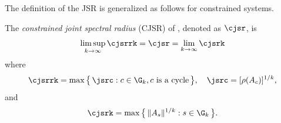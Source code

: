 The definition of the JSR is generalized as follows for constrained systems.
\begin{definition}
  \label{def:cjsr}
  The \emph{constrained joint spectral radius} (CJSR) of
  , denoted as $\cjsr$,
  is
  \begin{equation}
    \label{eq:jsrtheo}
    \limsup_{k \to \infty} \cjsrrk = \cjsr = \lim_{k \to \infty} \cjsrk
  \end{equation}
  where
  \begin{equation}
    \label{eq:cjsrrk}
    \cjsrrk
    = \max \big\{\, \jsrc : c \in \G_k, c \text{ is a cycle}\,\big\}, \quad \jsrc = [\rho(A_c)]^{1/k},
  \end{equation}
  and
  \begin{equation}
    \label{eq:cjsrk}
    \cjsrk =
    \max \big\{\, \|A_s\|^{1/k}\\: s \in \G_k \,\big\}.
  \end{equation}
\end{definition}
